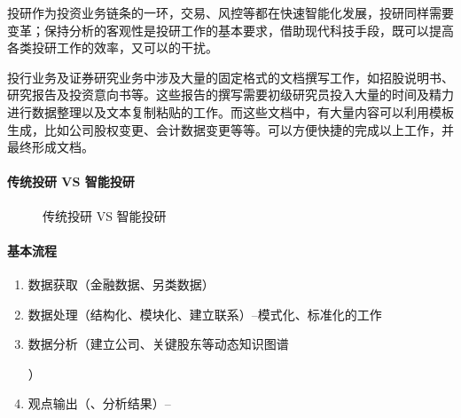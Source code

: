 \documentclass[letterpaper,10pt,english]{sphinxmanual}
\begin{document}
投研作为投资业务链条的一环，交易、风控等都在快速智能化发展，投研同样需要变革；保持分析的客观性是投研工作的基本要求，借助现代科技手段，既可以提高各类投研工作的效率，又可以的干扰。

投行业务及证券研究业务中涉及大量的固定格式的文档撰写工作，如招股说明书、研究报告及投资意向书等。这些报告的撰写需要初级研究员投入大量的时间及精力进行数据整理以及文本复制粘贴的工作。而这些文档中，有大量内容可以利用模板生成，比如公司股权变更、会计数据变更等等。可以方便快捷的完成以上工作，并最终形成文档。%
\begin{footnote}[1114]\sphinxAtStartFootnote
{}
%
\end{footnote}


\paragraph{传统投研 VS 智能投研}
\label{\detokenize{chapter_AI+Finance/AI_Investment_Research:vs}}
\begin{figure}[H]
\centering
\capstart

\noindent{}
\caption{传统投研 VS 智能投研}\label{\detokenize{chapter_AI+Finance/AI_Investment_Research:id11}}\end{figure}


\paragraph{基本流程}
\label{\detokenize{chapter_AI+Finance/AI_Investment_Research:id4}}\begin{enumerate}
%
\item {} 
数据获取（金融数据、另类数据）

\item {} 
数据处理（结构化、模块化、建立联系）–模式化、标准化的工作

\item {} 
数据分析（建立公司、关键股东等动态知识图谱%
\begin{footnote}[1115]\sphinxAtStartFootnote
{}
%
\end{footnote}）

\item {} 
观点输出（、分析结果）–

\end{enumerate}
\end{document}
